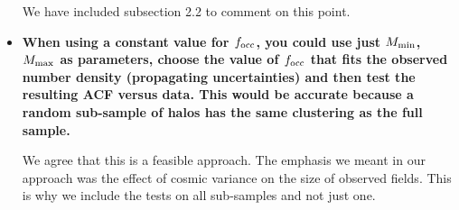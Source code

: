 \documentclass[12pts]{article}
\begin{document}
\begin{itemize}
We have included subsection 2.2 to comment on this point.

\item {\bf When using a constant value for $f_{\rm occ}$, you could use just
  $M_{\rm min}$, $M_{\rm max}$ as parameters, choose the value of
  $f_{\rm occ}$ that fits the observed number density (propagating
  uncertainties) and then test the resulting ACF versus data.  This
  would be accurate because a random sub-sample of halos has the same
  clustering as the full sample. } 

  We agree that this is a feasible approach. The emphasis we meant in
  our approach was the effect of cosmic variance on the size of
  observed fields. This is why we include the tests on all sub-samples
  and not just one.

\end{itemize}
\end{document}
